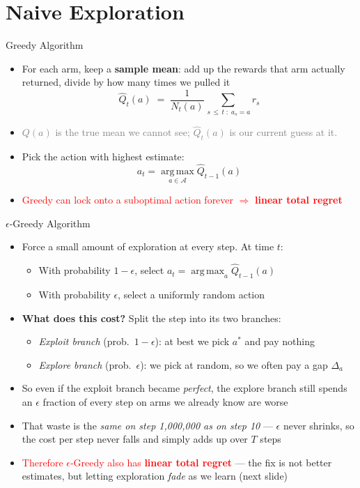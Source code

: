 \section{Naive Exploration}

\begin{frame}{Greedy Algorithm}
\begin{itemize}
    \item For each arm, keep a \textbf{sample mean}: add up the rewards that arm actually returned, divide by how many times we pulled it
    \[
        \hat{Q}_t(a) \;=\; \frac{1}{N_t(a)} \sum_{\,s \,\leq\, t \;:\; a_s = a} r_s
    \]
    \item \textcolor{gray}{$Q(a)$ is the true mean we cannot see; $\hat{Q}_t(a)$ is our current guess at it.}
    \item Pick the action with highest estimate:
    \[
        a_t = \operatorname*{arg\,max}_{a \in \mathcal{A}} \hat{Q}_{t-1}(a)
    \]
    \item \textcolor{red}{Greedy can lock onto a suboptimal action forever $\Rightarrow$ \textbf{linear total regret}}
\end{itemize}
\end{frame}

\begin{frame}{$\epsilon$-Greedy Algorithm}
\begin{itemize}
    \setlength{\itemsep}{0.35em}
    \item Force a small amount of exploration at every step. At time $t$:
    \begin{itemize}
        \item With probability $1 - \epsilon$, select $a_t = \operatorname*{arg\,max}_{a} \hat{Q}_{t-1}(a)$
        \item With probability $\epsilon$, select a uniformly random action
    \end{itemize}
    \item \textbf{What does this cost?} Split the step into its two branches:
    \begin{itemize}
        \item \emph{Exploit branch} (prob.\ $1-\epsilon$): at best we pick $a^*$ and pay nothing
        \item \emph{Explore branch} (prob.\ $\epsilon$): we pick at random, so we often pay a gap $\Delta_a$
    \end{itemize}
    \item So even if the exploit branch became \emph{perfect}, the explore branch still spends an $\epsilon$ fraction of every step on arms we already know are worse
    \item That waste is the \emph{same on step 1{,}000{,}000 as on step 10} --- $\epsilon$ never shrinks, so the cost per step never falls and simply adds up over $T$ steps
    \item \textcolor{red}{Therefore $\epsilon$-Greedy also has \textbf{linear total regret}} --- the fix is not better estimates, but letting exploration \emph{fade} as we learn (next slide)
\end{itemize}
\end{frame}

